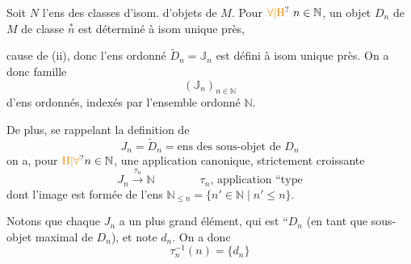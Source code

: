 Soit \(N\) l'ens  des classes d'isom. d'objets de \(M\). 
Pour \(\unsure{\forall|\mathrm H}\ n\in\mathbb N\), un objet \(D_n\) de \(M\) de classe \(\overset{\ast}{n}\) est déterminé à isom unique près,
 cause de (ii),
donc l'ens ordonné \(\widetilde D_n=\mathbb J_n\) est défini à isom unique près.
On a donc  famille
\[
(\mathbb J_n)_{n\in\mathbb N}
\]
d'ens ordonnés, indexés par l'ensemble ordonné \(\mathbb N\).

De plus, se rappelant la definition de
\[
 J_n=\widetilde D_n=\text{ens des sous-objet de }D_n
\]
on a, pour \(\unsure{\mathrm{H}|\forall} n\in\mathbb N\), une application canonique, strictement croissante
\[
 J_n\xrightarrow{\tau_n}\mathbb N \qquad\qquad
 \text{\(\tau_n\), application ``type}
\]
dont l'image est formée  de l'ens
\(\mathbb N_{\leq n}=\{n'\in\mathbb N\mid n'\leq n\}\).

Notons que chaque \(J_n\) a un plus grand élément, qui est ``\(D_n\) (en tant que  sous-objet maximal de \(D_n\)), et  note \(d_n\). On a donc 
\[
 \tau_n^{-1}(n)=\{d_n\}
\]

